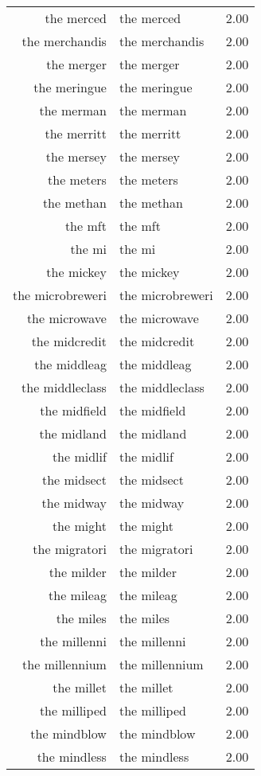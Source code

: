 \begin{table}[ht]
\begin{tabular}{rlr}
  the merced & the merced & 2.00 \\ 
  the merchandis & the merchandis & 2.00 \\ 
  the merger & the merger & 2.00 \\ 
  the meringue & the meringue & 2.00 \\ 
  the merman & the merman & 2.00 \\ 
  the merritt & the merritt & 2.00 \\ 
  the mersey & the mersey & 2.00 \\ 
  the meters & the meters & 2.00 \\ 
  the methan & the methan & 2.00 \\ 
  the mft & the mft & 2.00 \\ 
  the mi & the mi & 2.00 \\ 
  the mickey & the mickey & 2.00 \\ 
  the microbreweri & the microbreweri & 2.00 \\ 
  the microwave & the microwave & 2.00 \\ 
  the midcredit & the midcredit & 2.00 \\ 
  the middleag & the middleag & 2.00 \\ 
  the middleclass & the middleclass & 2.00 \\ 
  the midfield & the midfield & 2.00 \\ 
  the midland & the midland & 2.00 \\ 
  the midlif & the midlif & 2.00 \\ 
  the midsect & the midsect & 2.00 \\ 
  the midway & the midway & 2.00 \\ 
  the might & the might & 2.00 \\ 
  the migratori & the migratori & 2.00 \\ 
  the milder & the milder & 2.00 \\ 
  the mileag & the mileag & 2.00 \\ 
  the miles & the miles & 2.00 \\ 
  the millenni & the millenni & 2.00 \\ 
  the millennium & the millennium & 2.00 \\ 
  the millet & the millet & 2.00 \\ 
  the milliped & the milliped & 2.00 \\ 
  the mindblow & the mindblow & 2.00 \\ 
  the mindless & the mindless & 2.00 \\ 

\end{tabular}
\end{table}
